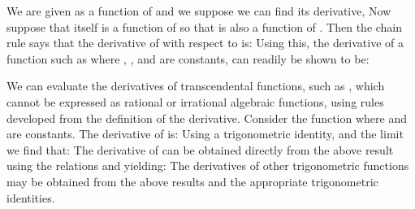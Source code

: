 {{We are given  as a function of  and we suppose we can find its derivative,
%
%
Now suppose that  itself is a function of  so that  is also a function of .
Then the chain rule says that the derivative of  with respect to  is:
%
%
Using this, the derivative of a function such as
%
%
where , , and  are constants, can readily be shown to be: 
%
}
%
%
%
\par{We can evaluate the derivatives of transcendental functions, such as
, which cannot be expressed as rational or irrational algebraic
functions, using rules developed from the definition of the derivative.
Consider the function  where  and \m{\delta}
are constants.
The derivative of  is:
%
%
Using a trigonometric identity,
%
%
%
and the limit 
%
%
we find that: 
%
The derivative of  can be obtained directly from the
above result using the relations
%
%
and
%
%
yielding:
%
The derivatives of other trigonometric functions may be obtained from the
above results and the appropriate trigonometric identities.
}}
